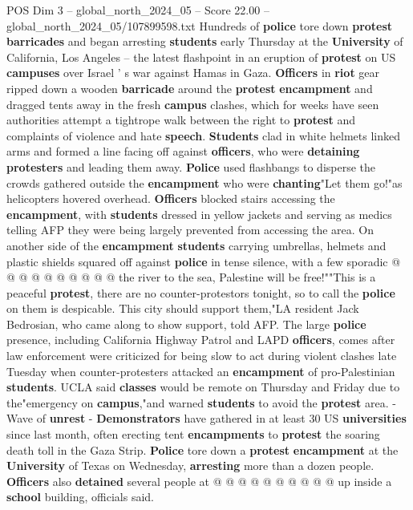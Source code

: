 \begin{textsample}{POS Dim 3 – global\_north\_2024\_05 – Score 22.00 – global\_north\_2024\_05/107899598.txt}  \label{ex:f3_pos_012}
Hundreds of \textbf{police} tore down \textbf{protest} \textbf{barricades} and began arresting \textbf{students} early Thursday at the \textbf{University} of California, Los Angeles -- the latest flashpoint in an eruption of \textbf{protest} on US \textbf{campuses} over Israel ' s war against Hamas in Gaza. \textbf{Officers} in \textbf{riot} gear ripped down a wooden \textbf{barricade} around the \textbf{protest} \textbf{encampment} and dragged tents away in the fresh \textbf{campus} clashes, which for weeks have seen authorities attempt a tightrope walk between the right to \textbf{protest} and complaints of violence and hate \textbf{speech}. \textbf{Students} clad in white helmets linked arms and formed a line facing off against \textbf{officers}, who were \textbf{detaining} \textbf{protesters} and leading them away. \textbf{Police} used flashbangs to disperse the crowds gathered outside the \textbf{encampment} who were \textbf{chanting}"Let them go!"as helicopters hovered overhead. \textbf{Officers} blocked stairs accessing the \textbf{encampment}, with \textbf{students} dressed in yellow jackets and serving as medics telling AFP they were being largely prevented from accessing the area.
On another side of the \textbf{encampment} \textbf{students} carrying umbrellas, helmets and plastic shields squared off against \textbf{police} in tense silence, with a few sporadic @ @ @ @ @ @ @ @ @ @ the river to the sea, Palestine will be free!""This is a peaceful \textbf{protest}, there are no counter-protestors tonight, so to call the \textbf{police} on them is despicable.
This city should support them,"LA resident Jack Bedrosian, who came along to show support, told AFP.
The large \textbf{police} presence, including California Highway Patrol and LAPD \textbf{officers}, comes after law enforcement were criticized for being slow to act during violent clashes late Tuesday when counter-protesters attacked an \textbf{encampment} of pro-Palestinian \textbf{students}.
UCLA said \textbf{classes} would be remote on Thursday and Friday due to the"emergency on \textbf{campus},"and warned \textbf{students} to avoid the \textbf{protest} area. - Wave of \textbf{unrest} - \textbf{Demonstrators} have gathered in at least 30 US \textbf{universities} since last month, often erecting tent \textbf{encampments} to \textbf{protest} the soaring death toll in the Gaza Strip. \textbf{Police} tore down a \textbf{protest} \textbf{encampment} at the \textbf{University} of Texas on Wednesday, \textbf{arresting} more than a dozen people. \textbf{Officers} also \textbf{detained} several people at @ @ @ @ @ @ @ @ @ @ up inside a \textbf{school} building, officials said.

\end{textsample}
